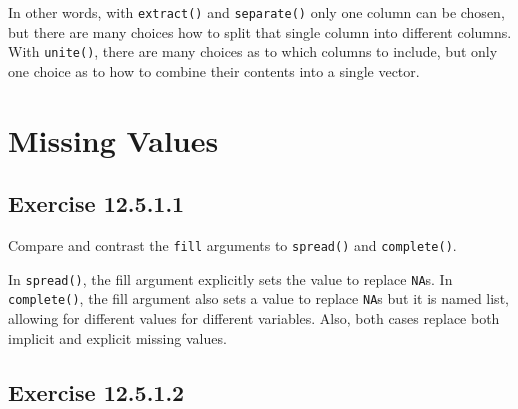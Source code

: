 \documentclass[]{book}
\newenvironment{Shaded}{\begin{snugshade}}{\end{snugshade}}
\newcommand{\CommentTok}[1]{\textcolor[rgb]{0.56,0.35,0.01}{\textit{#1}}}
\newcommand{\DataTypeTok}[1]{\textcolor[rgb]{0.13,0.29,0.53}{#1}}
\newcommand{\DecValTok}[1]{\textcolor[rgb]{0.00,0.00,0.81}{#1}}
\newcommand{\KeywordTok}[1]{\textcolor[rgb]{0.13,0.29,0.53}{\textbf{#1}}}
\newcommand{\NormalTok}[1]{#1}
\newcommand{\OperatorTok}[1]{\textcolor[rgb]{0.81,0.36,0.00}{\textbf{#1}}}
\newcommand{\StringTok}[1]{\textcolor[rgb]{0.31,0.60,0.02}{#1}}
\theoremstyle{plain}
\theoremstyle{remark}
\begin{document}
\begin{Shaded}
\end{Shaded}

In other words, with \texttt{extract()} and \texttt{separate()} only one column can be chosen,
but there are many choices how to split that single column into different columns.
With \texttt{unite()}, there are many choices as to which columns to include, but only one
choice as to how to combine their contents into a single vector.

\hypertarget{missing-values-1}{%
\section{Missing Values}\label{missing-values-1}}

\hypertarget{exercise-12.5.1.1}{%
\subsection*{\texorpdfstring{Exercise {12.5.1.1}}{Exercise 12.5.1.1}}\label{exercise-12.5.1.1}}

Compare and contrast the \texttt{fill} arguments to \texttt{spread()} and \texttt{complete()}.

In \texttt{spread()}, the fill argument explicitly sets the value to replace \texttt{NA}s.
In \texttt{complete()}, the fill argument also sets a value to replace \texttt{NA}s but it is named list, allowing for different values for different variables.
Also, both cases replace both implicit and explicit missing values.

\hypertarget{exercise-12.5.1.2}{%
\subsection*{\texorpdfstring{Exercise {12.5.1.2}}{Exercise 12.5.1.2}}\label{exercise-12.5.1.2}}
\end{document}
